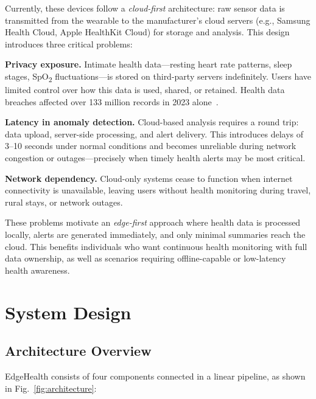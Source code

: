\documentclass[conference]{IEEEtran}
\begin{document}
Currently, these devices follow a \textit{cloud-first} architecture: raw sensor data is transmitted from the wearable to the manufacturer's cloud servers (e.g., Samsung Health Cloud, Apple HealthKit Cloud) for storage and analysis. This design introduces three critical problems:

\textbf{Privacy exposure.} Intimate health data---resting heart rate patterns, sleep stages, SpO\textsubscript{2} fluctuations---is stored on third-party servers indefinitely. Users have limited control over how this data is used, shared, or retained. Health data breaches affected over 133 million records in 2023 alone~\cite{hipaa_breaches}.

\textbf{Latency in anomaly detection.} Cloud-based analysis requires a round trip: data upload, server-side processing, and alert delivery. This introduces delays of 3--10 seconds under normal conditions and becomes unreliable during network congestion or outages---precisely when timely health alerts may be most critical.

\textbf{Network dependency.} Cloud-only systems cease to function when internet connectivity is unavailable, leaving users without health monitoring during travel, rural stays, or network outages.

These problems motivate an \textit{edge-first} approach where health data is processed locally, alerts are generated immediately, and only minimal summaries reach the cloud. This benefits individuals who want continuous health monitoring with full data ownership, as well as scenarios requiring offline-capable or low-latency health awareness.

\section{System Design}

\subsection{Architecture Overview}

EdgeHealth consists of four components connected in a linear pipeline, as shown in Fig.~\ref{fig:architecture}:
\end{document}
